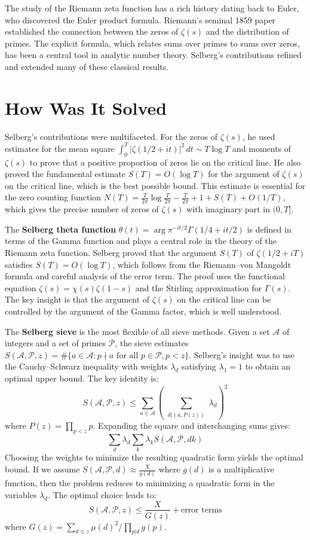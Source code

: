 The study of the Riemann zeta function has a rich history dating back to Euler, who discovered the Euler product formula. Riemann's seminal 1859 paper established the connection between the zeros of $\zeta(s)$ and the distribution of primes. The explicit formula, which relates sums over primes to sums over zeros, has been a central tool in analytic number theory. Selberg's contributions refined and extended many of these classical results.

\section{How Was It Solved}

Selberg's contributions were multifaceted. For the zeros of $\zeta(s)$, he used estimates for the mean square $\int_0^T |\zeta(1/2+it)|^2 \, dt \sim T \log T$ and moments of $\zeta(s)$ to prove that a positive proportion of zeros lie on the critical line. He also proved the fundamental estimate $S(T) = O(\log T)$ for the argument of $\zeta(s)$ on the critical line, which is the best possible bound. This estimate is essential for the zero counting function $N(T) = \frac{T}{2\pi} \log \frac{T}{2\pi} - \frac{T}{2\pi} + 1 + S(T) + O(1/T)$, which gives the precise number of zeros of $\zeta(s)$ with imaginary part in $(0, T]$.

The \textbf{Selberg theta function} $\theta(t) = \arg \pi^{-it/2} \Gamma(1/4 + it/2)$ is defined in terms of the Gamma function and plays a central role in the theory of the Riemann zeta function. Selberg proved that the argument $S(T)$ of $\zeta(1/2 + iT)$ satisfies $S(T) = O(\log T)$, which follows from the Riemann--von Mangoldt formula and careful analysis of the error term. The proof uses the functional equation $\zeta(s) = \chi(s) \zeta(1-s)$ and the Stirling approximation for $\Gamma(s)$. The key insight is that the argument of $\zeta(s)$ on the critical line can be controlled by the argument of the Gamma factor, which is well understood.

The \textbf{Selberg sieve} \cite{selbergsieve} is the most flexible of all sieve methods. Given a set $\mathcal{A}$ of integers and a set of primes $\mathcal{P}$, the sieve estimates $S(\mathcal{A}, \mathcal{P}, z) = \#\{a \in \mathcal{A} : p \nmid a \text{ for all } p \in \mathcal{P}, p < z\}$. Selberg's insight was to use the Cauchy--Schwarz inequality with weights $\lambda_d$ satisfying $\lambda_1 = 1$ to obtain an optimal upper bound. The key identity is:
\[S(\mathcal{A}, \mathcal{P}, z) \leq \sum_{a \in \mathcal{A}} \left( \sum_{\substack{d | (a, P(z))}} \lambda_d \right)^2\]
where $P(z) = \prod_{p < z} p$. Expanding the square and interchanging sums gives:
\[\sum_{d} \lambda_d \sum_{k} \lambda_k S(\mathcal{A}, \mathcal{P}, dk)\]
Choosing the weights to minimize the resulting quadratic form yields the optimal bound. If we assume $S(\mathcal{A}, \mathcal{P}, d) \approx \frac{X}{g(d)}$ where $g(d)$ is a multiplicative function, then the problem reduces to minimizing a quadratic form in the variables $\lambda_d$. The optimal choice leads to:
\[S(\mathcal{A}, \mathcal{P}, z) \leq \frac{X}{G(z)} + \text{error terms}\]
where $G(z) = \sum_{d \leq z} \mu(d)^2 / \prod_{p|d} g(p)$.


